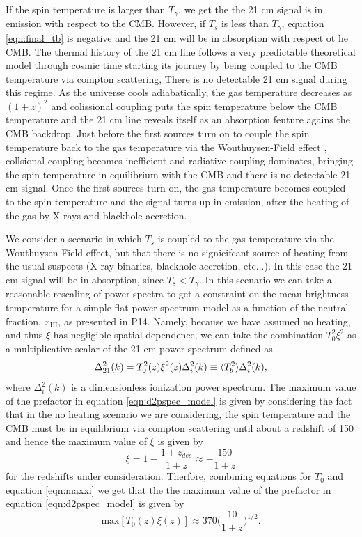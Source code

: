 \documentclass[twocolumn,numberedappendix]{emulateapj} \shorttitle{PSA64}
\begin{document}
If the spin temperature is larger than $T_{\gamma}$, we get the the 21 cm signal is in
emission with respect to the CMB. However, if $T_{s}$ is less than $T_{\gamma}$,
equation \ref{eqn:final_tb} is negative and the 21 cm will be in absorption with
respect ot he CMB.
The thermal history of the 21 cm line follows a very predictable theoretical
model through cosmic time starting its journey by being coupled to the
CMB temperature via compton scattering, There is no detectable 21 cm
signal during this regime. As the universe cools adiabatically, the gas temperature decreases as
$(1+z)^{2}$ and colissional coupling puts the spin temperature below the CMB
temperature and the 21 cm line reveals itself as an absorption feuture agains
the CMB backdrop. Just before the first sources
turn on to couple the spin temperature back to the
gas temperature via the Wouthuysen-Field effect \citep{wouthuysen1952}, collsional coupling becomes
inefficient and radiative coupling dominates, bringing the spin temperature in
equilibrium with the CMB and there is no detectable 21 cm signal.
Once the first sources turn on, the gas temperature
becomes coupled to the spin temperature and the signal turns up in emission,
after the heating of the gas by X-rays and blackhole accretion. 

We consider a scenario in which $T_{s}$ is coupled to the gas temperature via
the Wouthuysen-Field effect, but that there is no signicifcant source of heating
from the usual suspects (X-ray binaries, blackhole accretion, etc...). In this
case the 21 cm  signal will be in absorption, since $T_{s} < T_{\gamma}$.
In this scenario we can take a reasonable rescaling of power spectra to get a
constraint on the mean brightness temperature for a simple flat power spectrum model
as a function of the neutral fraction, $x_{\text{HI}}$, as presented in P14. Namely,
because we have assumed no heating, and thus $\xi$ has negligible spatial
dependence, we can take the combination
$T_{0}^{2}\xi^{2}$ as a multiplicative scalar of the 21 cm power spectrum
defined as 
\begin{equation}\label{eqn:d2pspec_model}
    \Delta^{2}_{21}(k) = T_{0}^{2}(z)\xi^{2}(z)\Delta_{i}^{2}(k)\equiv
\expval{T_{b}^{2}}\Delta_{i}^{2}(k),
\end{equation}
where $\Delta_{i}^{2}(k)$ is a
dimensionless ionization power spectrum. The maximum value of the
prefactor in equation \ref{eqn:d2pspec_model} is given by considering the fact
that in the no heating scenario we are considering, the spin temperature and the
CMB must be in equilibrium via compton scattering until about a redshift of 150
\citep{furlanetto_et_al2006} and hence the maximum value of $\xi$ is given by
\begin{equation}\label{eqn:maxxi}
\xi = 1 -\frac{1+z_{dec}}{1+z} \approx -\frac{150}{1+z} 
\end{equation}
for the redshifts under consideration. Therfore, combining equations for $T_{0}$
and equation \ref{eqn:maxxi} we get that the the maximum value of the prefactor in
equation \ref{eqn:d2pspec_model} is given by 
\begin{equation}
    \text{max}[T_{0}(z)\xi(z)] \approx 370\big(\frac{10}{1+z}\big)^{1/2}.
\end{equation}
\end{document}
